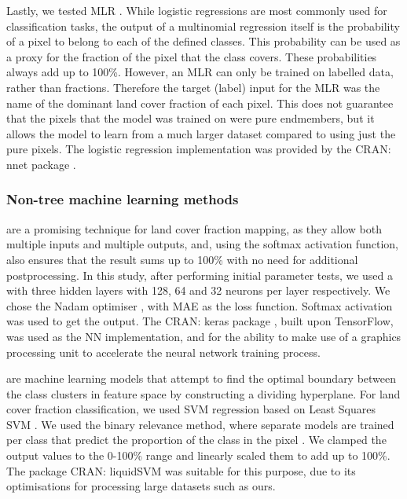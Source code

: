 \documentclass[review,authoryear,3p]{elsarticle}
\newcommand{\cran}[1]{CRAN: #1}
\begin{document}
Lastly, we tested \gls{MLR} \citep{theil_multinomial_1969}.
While logistic regressions are most commonly used for classification tasks, the output of a multinomial regression itself is the probability of a pixel to belong to each of the defined classes.
This probability can be used as a proxy for the fraction of the pixel that the class covers.
These probabilities always add up to 100\%.
However, an \gls{MLR} can only be trained on labelled data, rather than fractions.
Therefore the target (label) input for the \ac{MLR} was the name of the dominant land cover fraction of each pixel.
This does not guarantee that the pixels that the model was trained on were pure endmembers, but it allows the model to learn from a much larger dataset compared to using just the pure pixels.
The logistic regression implementation was provided by the \cran{nnet} package \citep{nnet}.

\subsubsection{Non-tree machine learning methods}

 are a promising technique for land cover fraction mapping, as they allow both multiple inputs and multiple outputs, and, using the softmax activation function, also ensures that the result sums up to 100\% with no need for additional postprocessing.
In this study, after performing initial parameter tests, we used a  \citep{dreyfus_artificial_1990} with three hidden layers with 128, 64 and 32 neurons per layer respectively.
We chose the Nadam optimiser \citep{dozat_incorporating_2016}, with \gls{MAE} as the loss function.
Softmax activation was used to get the output.
The \cran{keras} package \citep{keras}, built upon TensorFlow, was used as the \ac{NN} implementation, and for the ability to make use of a graphics processing unit to accelerate the neural network training process.

 are machine learning models that attempt to find the optimal boundary between the class clusters in feature space by constructing a dividing hyperplane.
For land cover fraction classification, we used \gls{SVM} regression based on Least Squares \gls{SVM} \citep{suykens_least_1999}.
We used the binary relevance method, where separate models are trained per class that predict the proportion of the class in the pixel \citep{karalas2016br}.
We clamped the output values to the 0-100\% range and linearly scaled them to add up to 100\%.
The package \cran{liquidSVM} \citep{liquidSVM} was suitable for this purpose, due to its optimisations for processing large datasets such as ours.
\end{document}
